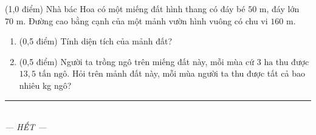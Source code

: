 \documentclass[12pt,a4paper]{article}
\begin{document}
\begin{ex} (1,0 điểm)
Nhà bác Hoa có một miếng đất hình thang có đáy bé $50\text{ m}$, đáy lớn $70\text{ m}$. Đường cao bằng cạnh của một mảnh vườn hình vuông có chu vi $160\text{ m}$.
\begin{center}
\end{center}
\begin{enumerate}[label=\textbf{\alph*)}, leftmargin=0.8cm, itemsep=2pt]
\item (0,5 điểm) Tính diện tích của mảnh đất?
\item (0,5 điểm) Người ta trồng ngô trên miếng đất này, mỗi mùa cứ $3\text{ ha}$ thu được $13{,}5\text{ tấn ngô}$. Hỏi trên mảnh đất này, mỗi mùa người ta thu được tất cả bao nhiêu kg ngô?
\end{enumerate}
\end{ex}
\vspace{1.5mm}


\begin{center}
\rule{4cm}{0.4pt}\\
\textit{--- HẾT ---}
\end{center}
\end{document}
